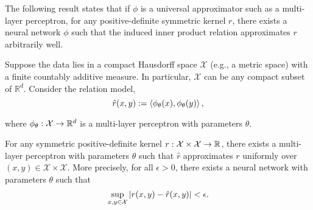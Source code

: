 
The following result states that if $\phi$ is a universal approximator such as a multi-layer perceptron, for any positive-definite symmetric kernel $r$, there exists a neural network $\phi$ such that the induced inner product relation approximates $r$ arbitrarily well.

\begin{theorem}
	\label{theorem:function_class_inner_product_relnn}
	\hphantom{~}

	Suppose the data lies in a compact Hausdorff space \(\mathcal{X}\) (e.g., a metric space) with a finite countably additive measure. In particular, \(\mathcal{X}\) can be any compact subset of \(\mathbb{R}^d\). Consider the relation model,
	\begin{equation*}
		\hat{r}(x, y) := \left \langle \phi_{\theta}(x), \phi_{\theta}(y) \right\rangle,
	\end{equation*}

    \noindent where $\phi_{\theta}: {\mathcal{X}} \to \mathbb{R}^d$ is a multi-layer perceptron with parameters $\theta$.

	For any symmetric positive-definite kernel $r: {\mathcal{X}} \times {\mathcal{X}} \to \mathbb{R}$, there exists a multi-layer perceptron with parameters $\theta$ such that $\hat{r}$ approximates $r$ uniformly over \((x,y) \in \mathcal{X}\times\mathcal{X}\). More precisely, for all \(\epsilon > 0\), there exists a neural network with parameters $\theta$ such that 
    \[\sup_{x,y \in \mathcal{X}}{\left\lvert r(x,y) - \hat{r}(x,y)\right\rvert} < \epsilon.\]
\end{theorem}

